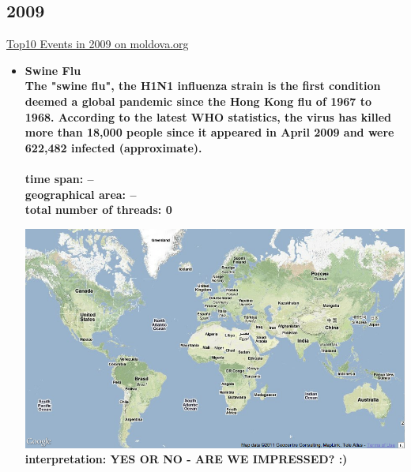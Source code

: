 \documentclass[11pt,a4paper,english]{article}
\begin{document}
			\subsection{2009}
			\href{http://social.moldova.org/news/10-most-important-world-events-of-2009-217390-eng.html}{Top10 Events in 2009 on moldova.org}
				\begin{itemize}
					\item \bf Swine Flu \rm
						\\ The "swine flu", the H1N1 influenza strain is the first condition deemed a global pandemic since the Hong Kong flu of 1967 to 1968. According to the latest WHO statistics, the virus has killed more than 18,000 people since it appeared in April 2009 and were 622,482 infected (approximate).
						\\\\ \bf time span: \rm --
						\\ \bf geographical area: \rm --
						\\ \bf total number of threads: \rm 0
						
						\includegraphics[width=130mm]{img/2005-1}
						\bf interpretation: \rm YES OR NO - ARE WE IMPRESSED? :)
						
						
						

\end{itemize}
\end{document}
